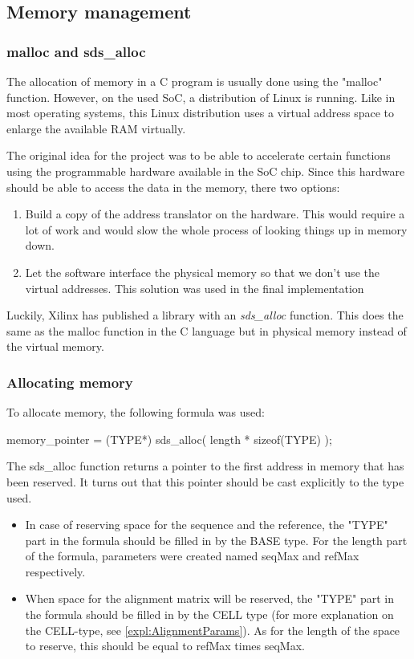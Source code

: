 \subsection{Memory management}

\subsubsection{malloc and sds\_alloc}
The allocation of memory in a C program is usually done using the "malloc" function. However, on the used SoC, a distribution of Linux is running. Like in most operating systems, this Linux distribution uses a virtual address space to enlarge the available RAM virtually. 

The original idea for the project was to be able to accelerate certain functions using the programmable hardware available in the SoC chip. Since this hardware should be able to access the data in the memory, there two options:
\begin{enumerate}
	\item Build a copy of the address translator on the hardware. This would require a lot of work and would slow the whole process of looking things up in memory down.
	\item Let the software interface the physical memory so that we don't use the virtual addresses. This solution was used in the final implementation
\end{enumerate}

Luckily, Xilinx has published a library with an \emph{sds\_alloc} function. This does the same as the malloc function in the C language but in physical memory instead of the virtual memory.

\subsubsection{Allocating memory}
To allocate memory, the following formula was used:

\begin{lcverbatim}
	memory_pointer = (TYPE*) sds_alloc( length * sizeof(TYPE) );
\end{lcverbatim}

The sds\_alloc function returns a pointer to the first address in memory that has been reserved. It turns out that this pointer should be cast explicitly to the type used.

\begin{itemize}
	\item In case of reserving space for the sequence and the reference, the "TYPE" part in the formula should be filled in by the BASE type. For the length part of the formula, parameters were created named seqMax and refMax respectively.
	\item When space for the alignment matrix will be reserved, the "TYPE" part in the formula should be filled in by the CELL type (for more explanation on the CELL-type, see \ref{expl:AlignmentParams}). As for the length of the space to reserve, this should be equal to refMax times seqMax.
\end{itemize}


